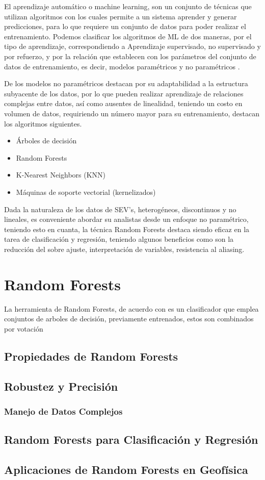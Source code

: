 	El aprendizaje automático o machine learning, son un conjunto de técnicas que utilizan algoritmos con los cuales permite a un sistema aprender y generar predicciones, para lo que requiere un conjunto de datos para poder realizar el entrenamiento. Podemos clasificar los algoritmos de ML de dos maneras, por el tipo de aprendizaje, correspondiendo a Aprendizaje supervisado, no supervisado y por refuerzo, y por la relación que establecen con los parámetros del conjunto de datos de entrenamiento, es decir, modelos paramétricos y no paramétricos \citep{li2024}. 
	
	De los modelos no paramétricos destacan por su adaptabilidad a la estructura subyacente de los datos, por lo que pueden realizar aprendizaje de relaciones complejas entre datos, así como ausentes de linealidad, teniendo un costo en volumen de datos, requiriendo un número mayor para su entrenamiento, destacan los algoritmos siguientes.
	
	\begin{itemize}
		\item Árboles de decisión
		\item Random Forests
		\item K-Nearest Neighbors (KNN)
		\item Máquinas de soporte vectorial (kernelizados)
	\end{itemize}
	
	Dada la naturaleza de los datos de SEV's, heterogéneos, discontinuos y no lineales, es conveniente abordar su analistas desde un enfoque no paramétrico, teniendo esto en cuanta, la técnica Random Forests destaca siendo eficaz en la tarea de clasificación y regresión, teniendo algunos beneficios como son la reducción del sobre ajuste, interpretación de variables, resistencia al aliasing.
	
	\section{Random Forests} 
		La herramienta de Random Forests,  de acuerdo con \citet{breiman2001} es un  clasificador que emplea conjuntos de arboles de decisión, previamente entrenados, estos son combinados por votación 
		\subsection{Propiedades de Random Forests}
		\subsection{Robustez y Precisión}
			\subsubsection{Manejo de Datos Complejos}
		\subsection{Random Forests para Clasificación y Regresión}
		\subsection{Aplicaciones de Random Forests en Geofísica}
	